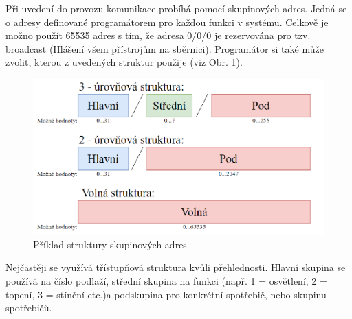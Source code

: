 Při uvedení do provozu komunikace probíhá pomocí skupinových adres. Jedná se o adresy definované programátorem pro každou funkci v systému. Celkově je možno použít 65535 adres s tím, že adresa 0/0/0 je rezervována pro tzv. broadcast (Hlášení všem přístrojům na sběrnici). Programátor si také může zvolit, kterou z uvedených struktur použije (viz Obr. \ref{fig:Příklad struktury skupinových adres}). 
\begin{figure}[!h]
  \begin{center}
    \includegraphics[scale=0.6]{obrazky/Skupinove adresovani.png}
  \end{center}
  \caption[Příklad struktury skupinových adres \cite{Celkovy prehled}]{Příklad struktury skupinových adres \cite{Celkovy prehled}}
  \label{fig:Příklad struktury skupinových adres}  
\end{figure}
Nejčastěji se využívá třístupňová struktura kvůli přehlednosti. Hlavní skupina se používá na číslo podlaží,  střední skupina na funkci (např. 1 = osvětlení, 2 = topení, 3 = stínění etc.)a podskupina pro konkrétní spotřebič, nebo skupinu spotřebičů. \cite{Celkovy prehled}
\\
\\
\\
